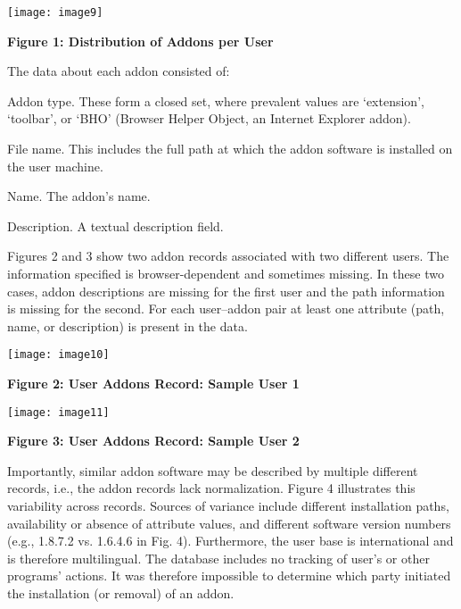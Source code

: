 \documentclass{article} %
\begin{document}
 

\noindent \texttt{[image: image9]}

\noindent \textbf{Figure 1: Distribution of Addons per User}

The data about each addon consisted of:  

\noindent  Addon type.  These form a closed set, where prevalent values are `extension', `toolbar', or `BHO' (Browser Helper Object, an Internet Explorer addon). 

\noindent      File name. This includes the full path at which the addon software is installed on the user machine. 

\noindent      Name.  The addon's name. 

\noindent      Description.  A textual description field. 



Figures 2 and 3 show two addon records associated with two different users. The information specified is browser-dependent and sometimes missing. In these two cases, addon descriptions are missing for the first user and the path information is missing for the second. For each user--addon pair at least one attribute (path, name, or description) is present in the data. 



\noindent \texttt{[image: image10]}

\noindent \textbf{Figure 2: User Addons Record: Sample User 1}

  



\noindent \texttt{[image: image11]}

\noindent \textbf{Figure 3: User Addons Record: Sample User 2}

\noindent 

  

Importantly, similar addon software may be described by multiple different records, i.e., the addon records lack normalization. Figure 4 illustrates this variability across records. Sources of variance include different installation paths, availability or absence of attribute values, and different software version numbers (e.g., 1.8.7.2 vs. 1.6.4.6 in Fig. 4). Furthermore, the user base is international and is therefore multilingual. The database includes no tracking of user's or other programs' actions. It was therefore impossible to determine which party initiated the installation (or removal) of an addon.  
\end{document}
